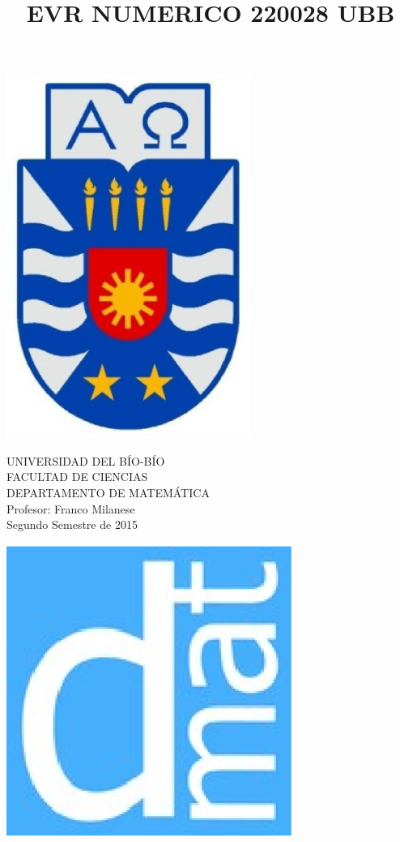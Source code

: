\documentclass[11pt]{article}
\begin{document}
\title{EVR NUMERICO 220028 UBB}

{\begin{minipage}{2cm}
\hspace*{1cm}\includegraphics[width=0.6\textwidth]{escubo-ubb.eps}
\end{minipage}
\begin{minipage}{12cm}
\small
{\bf \rm 
{
\begin{center}
{\footnotesize UNIVERSIDAD DEL B\'IO-B\'IO} \\
{\scriptsize FACULTAD DE CIENCIAS}  \\
{\scriptsize DEPARTAMENTO DE MATEM\'ATICA}  \\
{\scriptsize Profesor:  Franco Milanese}\\
{\scriptsize Segundo Semestre de 2015}
\end{center}
}}
\end{minipage}}
{\begin{minipage}{2cm}
\hspace*{-0.5cm}\vspace*{-0.05cm}\includegraphics[width=0.7\textwidth]{escudo-dmat.eps}
\end{minipage}}
\end{document}
